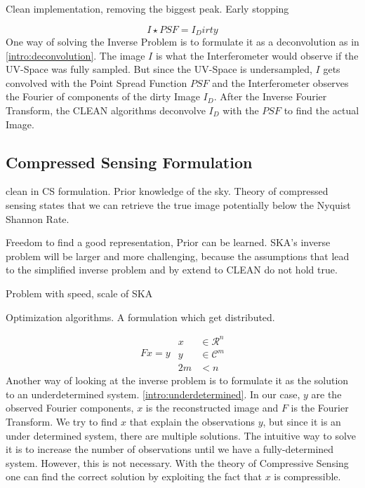 Clean implementation, removing the biggest peak. Early stopping


\begin{equation}\label{intro:deconvolution}
I \star PSF = I_Dirty
\end{equation}
One way of solving the Inverse Problem is to formulate it as a deconvolution as in \eqref{intro:deconvolution}. The image $I$ is what the Interferometer would observe if the UV-Space was fully sampled. But since the UV-Space is undersampled, $I$ gets convolved with the Point Spread Function $PSF$ and the Interferometer observes the Fourier of components of the dirty Image $I_D$. After the Inverse Fourier Transform, the CLEAN algorithms deconvolve $I_D$ with the $PSF$ to find the actual Image.


\subsection{Compressed Sensing Formulation}

clean in CS formulation. Prior knowledge of the sky. Theory of compressed sensing states that we can retrieve the true image potentially below the Nyquist Shannon Rate.

Freedom to find a good representation, Prior can be learned. SKA's inverse problem will be larger and more challenging, because the assumptions that lead to the simplified inverse problem and by extend to CLEAN do not hold true.

Problem with speed, scale of SKA 

Optimization algorithms. A formulation which get distributed.


\begin{equation}\label{intro:underdetermined}
\begin{split}
Fx = y
\end{split}
\begin{split}
x &\in \mathcal{R}^n\\
y &\in \mathcal{C}^m\\
2m &< n
\end{split}
\end{equation}
Another way of looking at the inverse problem is to formulate it as the solution to an underdetermined system. \eqref{intro:underdetermined}. In our case, $y$ are the observed Fourier components, $x$ is the reconstructed image and $F$ is the Fourier Transform. We try to find $x$ that explain the observations $y$, but since it is an under determined system, there are multiple solutions. The intuitive way to solve it is to increase the number of observations until we have a fully-determined system. However, this is not necessary. With the theory of Compressive Sensing one can find the correct solution by exploiting the fact that $x$ is compressible.

